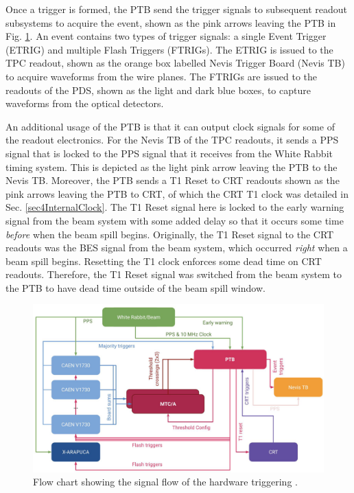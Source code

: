 Once a trigger is formed, the PTB send the trigger signals to subsequent readout subsystems to acquire the event, shown as the pink arrows leaving the PTB in Fig. \ref{fig:SBND_Trigger}.
An event contains two types of trigger signals: a single Event Trigger (ETRIG) and multiple Flash Triggers (FTRIGs).
The ETRIG is issued to the TPC readout, shown as the orange box labelled Nevis Trigger Board (Nevis TB) to acquire waveforms from the wire planes.
The FTRIGs are issued to the readouts of the PDS, shown as the light and dark blue boxes, to capture waveforms from the optical detectors.

An additional usage of the PTB is that it can output clock signals for some of the readout electronics.
For the Nevis TB of the TPC readouts, it sends a PPS signal that is locked to the PPS signal that it receives from the White Rabbit timing system.
This is depicted as the light pink arrow leaving the PTB to the Nevis TB.
Moreover, the PTB sends a T1 Reset to CRT readouts shown as the pink arrows leaving the PTB to CRT, of which the CRT T1 clock was detailed in Sec. \ref{sec4InternalClock}.
The T1 Reset signal here is locked to the early warning signal from the beam system with some added delay so that it occurs some time \textit{before} when the beam spill begins.
Originally, the T1 Reset signal to the CRT readouts was the BES signal from the beam system, which occurred \textit{right} when a beam spill begins.
Resetting the T1 clock enforces some dead time on CRT readouts.
Therefore, the T1 Reset signal was switched from the beam system to the PTB to have dead time outside of the beam spill window.  

\begin{figure}[hb!] 
\centering    
\includegraphics[width=1.0\textwidth]{SBND_Trigger}
\caption[Hardware Triggering Flow Chart]{
Flow chart showing the signal flow of the hardware triggering \cite{ptb_gvs}.
}
\label{fig:SBND_Trigger}
\end{figure}
